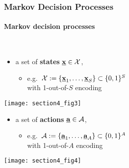 \subsubsection{Markov Decision Processes}
\paragraph{Markov decision processes}\mbox{}\\
\begin{minipage}{\textwidth}
		\begin{minipage}{7.75cm}
			\begin{itemize}
				\item a set of \textbf{states} $\underline{\mathbf{x}} \in \mathcal{X}$,
			\begin{itemize}
				\item e.g.~$\mathcal{X} := \{\underline{\mathbf{x}}_1, \ldots, \underline{\mathbf{x}}_S\} 
					\subset \{0,1\}^S$  \\with 1-out-of-$S$ encoding
			\end{itemize}
			\end{itemize} 
		\end{minipage}
		\hfill
		\begin{minipage}{4cm}
			\begin{center}
				\texttt{[image: section4\_fig3]} \\
			\end{center}
		\end{minipage}
	\end{minipage}

\begin{minipage}{\textwidth}
		\begin{minipage}{7.75cm}
			\begin{itemize}
			\item a set of \textbf{actions} $\underline{\mathbf{a}} \in \mathcal{A}$,
			\begin{itemize}
				\item e.g.~$\mathcal{A} := \{\underline{\mathbf{a}}_1, \ldots, \underline{\mathbf{a}}_A\} 
					\subset \{0,1\}^A$ \\ with 1-out-of-$A$ encoding
			\end{itemize}
			\end{itemize} 
		\end{minipage}
		\hfill
		\begin{minipage}{4cm}
			\begin{center}
				\texttt{[image: section4\_fig4]} \\
			\end{center}
		\end{minipage}
	\end{minipage}

